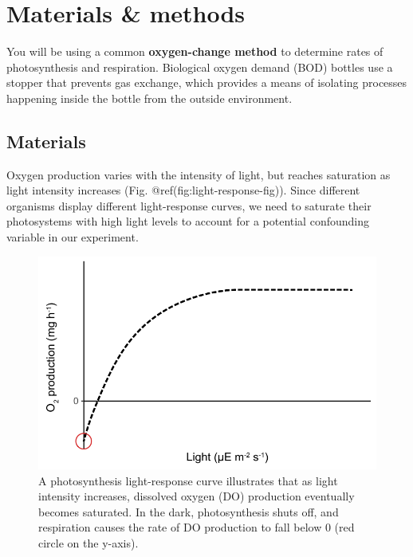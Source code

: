 \documentclass[11pt,]{article}
\begin{document}
\bigskip

\pagebreak

\hypertarget{materials-methods}{%
\section{Materials \& methods}\label{materials-methods}}

You will be using a common \textbf{oxygen-change method} to determine
rates of photosynthesis and respiration. Biological oxygen demand (BOD)
bottles use a stopper that prevents gas exchange, which provides a means
of isolating processes happening inside the bottle from the outside
environment.

\pagebreak

\hypertarget{materials}{%
\subsection{Materials}\label{materials}}

Oxygen production varies with the intensity of light, but reaches
saturation as light intensity increases (Fig.
@ref(fig:light-response-fig)). Since different organisms display
different light-response curves, we need to saturate their photosystems
with high light levels to account for a potential confounding variable
in our experiment.

\begin{figure}
\centering
\includegraphics{../_chapter_materials/light_response_curve.pdf}
\caption{A photosynthesis light-response curve illustrates that as light
intensity increases, dissolved oxygen (DO) production eventually becomes
saturated. In the dark, photosynthesis shuts off, and respiration causes
the rate of DO production to fall below 0 (red circle on the y-axis).}
\end{figure}
\end{document}
